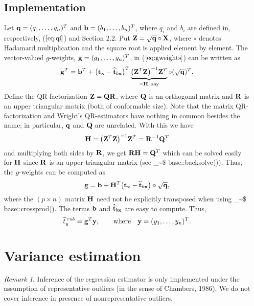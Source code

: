 \documentclass[a4paper,oneside,11pt,DIV=12]{scrartcl}
\makeatletter
\theoremstyle{remark}
\newtheorem*{rem}{Remark}
\newcommand\code{\bgroup\@makeother\_\@makeother\~\@makeother\$\@makeother\^\@codex}
\def\@codex#1{{\normalfont\ttfamily\hyphenchar\font=-1 #1}\egroup}
\makeatother
\begin{document}
\subsection{Implementation}
Let $\bold q = (q_1, \ldots, q_n)^T$ and $\bold b = (b_1, \ldots, b_n)^T$,
where $q_i$ and $b_i$ are defined in, respectively, ($\ref{eq:qi}$) and Section
2.2. Put $\bold Z = \sqrt{\bold q} \circ \bold X$, where $\circ$ denotes
Hadamard multiplication and the square root is applied element by element. The
vector-valued $g$-weights, $\bold g = (g_1, \ldots, g_n)^T$, in
($\ref{eq:gweights}$) can be written as
\begin{equation*}
    \bold g^T = \bold b^T + \big(\bold t_{\bold x} - \widehat{\bold t}_{b\bold
    x}\big)^T \underbrace{\big(\bold Z^T \bold Z\big)^{-1} \bold Z^T}_{=\bold
    H, \; \text{say}} \circ (\sqrt{\bold q})^T.
\end{equation*}
\noindent Define the QR factorization $\bold Z = \bold Q \bold R$, where $\bold
Q$ is an orthogonal matrix and $\bold R$ is an upper triangular matrix (both of
conformable size). Note that the matrix QR-factorization and Wright's
QR-estimators have nothing in common besides the name; in particular, $\bold q$
and $\bold Q$ are unrelated. With this we have
\begin{equation*}
	\bold H = \big(\bold Z^T\bold Z\big)^{-1} \bold Z^T =
   \bold R^{-1}\bold Q^T
\end{equation*}
\noindent and multiplying both sides by $\bold R$, we get $\bold R\bold H =
\bold Q^T$ which can be solved easily for $\bold H$ since $\bold R$ is an upper
triangular matrix (see \code{base::backsolve()}). Thus, the $g$-weights can be
computed as
\begin{equation*}
    \bold g = \bold b + \bold H^T \big(\bold t_{\bold x} - \widehat{\bold
    t}_{b\bold x}\big) \circ \sqrt{\bold q},
\end{equation*}
\noindent where the $(p \times n)$ matrix $\bold H$ need not be explicitly
transposed when using \code{base::crossprod()}. The terms $\bold b$ and
$\widehat{\bold t}_{b \bold x}$ are easy to compute. Thus,
\begin{equation*}
    \widehat{t}_y^{\;rob} = \bold g^T\bold y, \qquad \text{where} \quad \bold y
    = (y_1, \ldots, y_n)^T.
\end{equation*}

\section{Variance estimation}
\begin{rem}
Inference of the regression estimator is only implemented under the assumption
of representative outliers (in the sense of Chambers, 1986). We do not
cover inference in presence of nonrepresentative outliers.
\end{rem}
\end{document}
